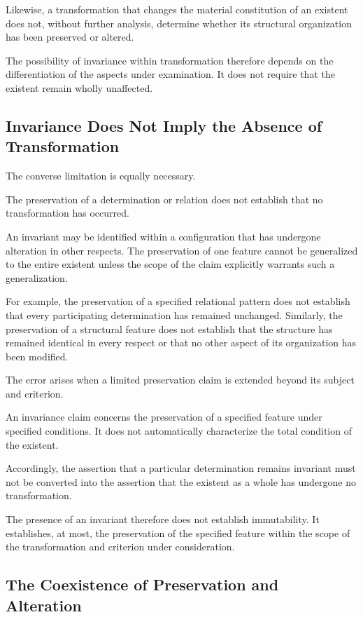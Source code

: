 Likewise, a transformation that changes the material
constitution of an existent does not, without further
analysis, determine whether its structural organization
has been preserved or altered.

The possibility of invariance within transformation
therefore depends on the differentiation of the aspects
under examination. It does not require that the existent
remain wholly unaffected.

\subsection{Invariance Does Not Imply the Absence of Transformation}

The converse limitation is equally necessary.

The preservation of a determination or relation does
not establish that no transformation has occurred.

An invariant may be identified within a configuration
that has undergone alteration in other respects.
The preservation of one feature cannot be generalized
to the entire existent unless the scope of the claim
explicitly warrants such a generalization.

For example, the preservation of a specified relational
pattern does not establish that every participating
determination has remained unchanged. Similarly, the
preservation of a structural feature does not establish
that the structure has remained identical in every
respect or that no other aspect of its organization
has been modified.

The error arises when a limited preservation claim
is extended beyond its subject and criterion.

An invariance claim concerns the preservation of
a specified feature under specified conditions. It
does not automatically characterize the total condition
of the existent.

Accordingly, the assertion that a particular determination
remains invariant must not be converted into the assertion
that the existent as a whole has undergone no transformation.

The presence of an invariant therefore does not establish
immutability. It establishes, at most, the preservation
of the specified feature within the scope of the
transformation and criterion under consideration.

\subsection{The Coexistence of Preservation and Alteration}


